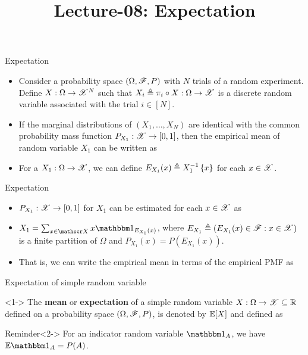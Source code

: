 \documentclass[12pt,aspectratio=169]{beamer}
\title{Lecture-08: Expectation}
\date{}
\begin{document}
\pagestyle{empty}
\maketitle

\begin{frame}{Expectation}
\begin{Example}
\begin{itemize}
\item <1-> Consider a probability space $(\Omega, \mathscr{F}, P)$ with $N$ trials of a random experiment. Define $X: \Omega \to \mathscr{X}^N$ 
such that $X_i \triangleq \pi_i\circ X :\Omega \to\mathscr{X}$ is a discrete random variable associated with the trial $i \in [N]$.   
\item <2-> If the marginal distributions of $(X_1, \dots, X_N)$ are identical with the common probability mass function $P_{X_1}: \mathscr{X} \to [0,1]$, then the empirical mean of random variable $X_1$ can be written as 
\item <3-> For a $X_1: \Omega \to \mathscr{X}$, 
we can define $E_{X_1}(x) \triangleq X_1^{-1}\left\{x\right\}$ for each $x \in \mathscr{X}$.  
\end{itemize}
\end{Example}
\end{frame}

\begin{frame}{Expectation}
\begin{Example}[Continued]
\begin{itemize}
\item <1-> $P_{X_1}:\mathscr{X} \to [0,1]$ for $X_1$ can be estimated for each $x \in \mathscr{X}$ as
\item <2-> $X_1 = \sum_{x \in \sX}x\Ind{E_{X_1}(x)}$, 
where $E_{X_1} \triangleq (E_{X_1}(x) \in \mathscr{F}: x \in \mathscr{X})$ is a finite partition of $\Omega$ and $P_{X_1}(x) = P(E_{X_1}(x))$. 
\item <3-> That is, we can write the empirical mean in terms of the empirical PMF as 
\end{itemize}
\end{Example}
\end{frame}

\begin{frame}{Expectation of simple random variable}
\begin{Definition}<1-> 
The \textbf{mean} or \textbf{expectation} of a simple random variable $X:\Omega \to \mathscr{X} \subseteq \mathbb{R}$ defined on a probability space $(\Omega, \mathscr{F}, P)$, is denoted by $\mathbb{E}[X]$ and defined as 
\end{Definition}
\begin{block}{Reminder}<2-> 
For an indicator random variable $\Ind{A}$, we have $\E\Ind{A} = P(A)$. 
\end{block}
\end{frame}
\end{document}

